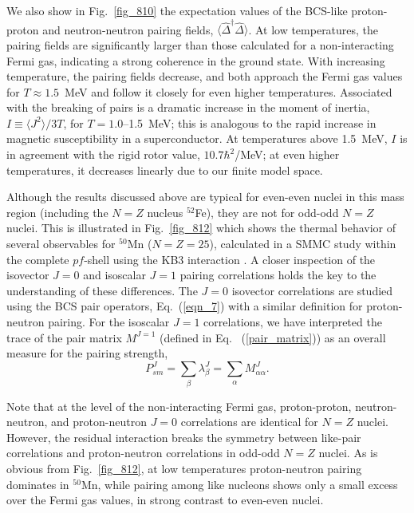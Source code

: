 \documentclass[rmp,aps,floatfix]{revtex4}
\begin{document}
We also show in Fig.~\ref{fig_810} the expectation values of the BCS-like
proton-proton and neutron-neutron pairing fields,
$\langle \hat \Delta^\dagger
\hat \Delta\rangle$.
At low temperatures, the pairing fields are significantly
larger than those calculated for a non-interacting Fermi gas, indicating a
strong coherence in the ground state. With increasing temperature, the
pairing fields decrease, and both approach the Fermi gas values for $T\approx
1.5$~MeV and follow it closely for even higher temperatures. Associated with
the breaking of pairs is a dramatic increase in the moment of inertia,
$I\equiv \langle J^2\rangle/3T$,
for $T=1.0$--1.5~MeV; this is analogous to the rapid increase in magnetic
susceptibility in a superconductor. At temperatures above 1.5~MeV, $I$ is in
agreement with the rigid rotor value, $10.7\hbar^2$/MeV; at even higher
temperatures, it decreases linearly due to our finite model space.

Although the results discussed above are typical for even-even nuclei
in this mass region
(including the $N=Z$ nucleus $^{52}$Fe), they are not for odd-odd $N=Z$
nuclei. This is illustrated in Fig.~\ref{fig_812} which shows the thermal
behavior of several observables for $^{50}$Mn ($N=Z=25$), calculated
in a SMMC study within the complete $pf$-shell using the KB3 interaction
\cite{kb3a,kb3b}.
A closer inspection of the isovector
$J=0$ and isoscalar $J=1$ pairing correlations holds the key to the
understanding of these differences. The $J=0$ isovector correlations
are studied using the BCS pair operators, Eq.~(\ref{eqn_7}) 
with a similar definition
for proton-neutron pairing. For the isoscalar $J=1$ correlations, we have
interpreted the trace of the pair matrix $M^{J=1}$ 
(defined in Eq.~ (\ref{pair_matrix})) as an overall
measure for the pairing strength,
\begin{equation}
P_{sm}^J = \sum_{\beta} \lambda_{\beta}^J = \sum_\alpha M^J_{\alpha\alpha}.
\label{pair_cor_mat}
\end{equation}

Note that at the level of the non-interacting Fermi gas, proton-proton,
neutron-neutron, and proton-neutron $J=0$ correlations are identical
for $N=Z$ nuclei. However, the residual interaction breaks the symmetry
between like-pair correlations and proton-neutron correlations
in odd-odd $N=Z$ nuclei. As is obvious from Fig.~\ref{fig_812}, 
at low temperatures
proton-neutron pairing dominates in $^{50}$Mn, while pairing among
like nucleons shows only a small excess over the Fermi gas values, in
strong contrast to even-even nuclei.
\end{document}
